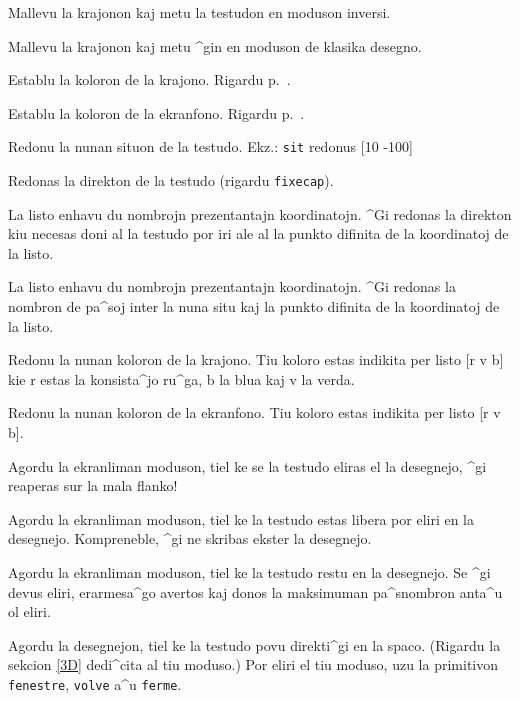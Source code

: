 Mallevu la krajonon kaj metu la testudon en moduson inversi.

Mallevu la krajonon kaj metu ^gin en moduson de klasika desegno.

\label{fcc} Establu la koloron de la krajono.  Rigardu p.~\pageref{couleurs}.

\label{fcfg}  
Establu la koloron de la ekranfono.  Rigardu p.~\pageref{couleurs}.

Redonu la nunan situon de la testudo.  Ekz.: \texttt{sit} redonus
{[}10 -100{]}

Redonas la direkton de la testudo (rigardu \texttt{fixecap}).

La listo enhavu du nombrojn prezentantajn koordinatojn.  ^Gi redonas 
la direkton kiu necesas doni al la testudo
por iri ale al la punkto difinita de la koordinatoj de la listo.

La listo enhavu du nombrojn prezentantajn koordinatojn.  
^Gi redonas la nombron de pa^soj inter la nuna situ kaj
la punkto difinita de la koordinatoj de la listo.

Redonu la nunan koloron de la krajono.  Tiu koloro estas indikita 
per listo [r v b] kie r estas la konsista^jo 
ru^ga, b la blua kaj v la verda.

Redonu la nunan koloron de la ekranfono.  Tiu koloro estas indikita 
per listo [r v b].

Agordu la ekranliman moduson, tiel ke se la testudo eliras
el la desegnejo, ^gi reaperas sur la mala flanko!

Agordu la ekranliman moduson, tiel ke la testudo estas libera 
por eliri en la desegnejo.
Kompreneble, ^gi ne skribas ekster la desegnejo.

Agordu la ekranliman moduson, tiel ke la testudo restu en la desegnejo.  
Se ^gi devus eliri, erarmesa^go avertos kaj donos la maksimuman 
pa^snombron anta^u ol eliri.

Agordu la desegnejon, tiel ke la testudo povu direkti^gi en la spaco.
(Rigardu la sekcion \ref{3D} dedi^cita al tiu moduso.)
Por eliri el tiu moduso, uzu la primitivon \texttt{fenestre}, 
\texttt{volve} a^u \texttt{ferme}.

